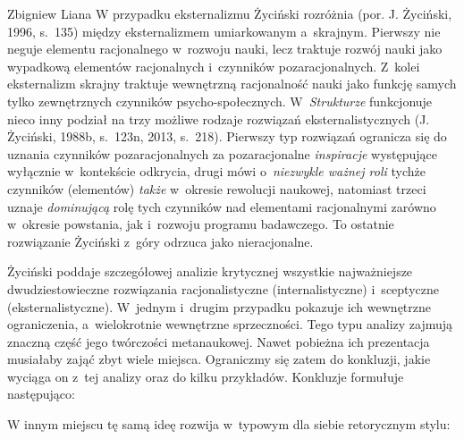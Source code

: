 \begin{artplenv}{Zbigniew Liana}
W przypadku eksternalizmu Życiński rozróżnia \label{ref:RNDAJVAwcgRgv}(por. J. Życiński, 1996, s.~135) między
eksternalizmem umiarkowanym a~skrajnym. Pierwszy nie neguje elementu racjonalnego w~rozwoju nauki, lecz traktuje rozwój
nauki jako wypadkową elementów racjonalnych i~czynników pozaracjonalnych. Z~kolei eksternalizm skrajny traktuje
wewnętrzną racjonalność nauki jako funkcję samych tylko zewnętrznych czynników psycho-społecznych. W~\textit{Strukturze}
funkcjonuje nieco inny podział na trzy możliwe rodzaje rozwiązań eksternalistycznych \label{ref:RNDcwjdYvX9ov}(J.
Życiński, 1988b, s.~123n, 2013, s.~218). Pierwszy typ rozwiązań ogranicza się do uznania czynników pozaracjonalnych za
pozaracjonalne \textit{inspiracje} występujące wyłącznie w~kontekście odkrycia, drugi mówi o~\textit{niezwykle ważnej roli}
tychże czynników (elementów) \textit{także} w~okresie rewolucji naukowej, natomiast trzeci uznaje \textit{dominującą} rolę
tych czynników nad elementami racjonalnymi zarówno w~okresie powstania, jak i~rozwoju programu badawczego. To ostatnie
rozwiązanie Życiński z~góry odrzuca jako nieracjonalne.

Życiński poddaje szczegółowej analizie krytycznej wszystkie najważniejsze dwudziestowieczne rozwiązania racjonalistyczne
(internalistyczne) i~sceptyczne (eksternalistyczne). W~jednym i~drugim przypadku pokazuje ich wewnętrzne
ograniczenia, a~wielokrotnie wewnętrzne sprzeczności. Tego typu analizy zajmują znaczną część jego twórczości metanaukowej. Nawet
pobieżna ich prezentacja musiałaby zająć zbyt wiele miejsca. Ograniczmy się zatem do konkluzji, jakie wyciąga on z~tej
analizy oraz do kilku przykładów. Konkluzje formułuje następująco:

W innym miejscu tę samą ideę rozwija w~typowym dla siebie retorycznym stylu:


\end{artplenv}
